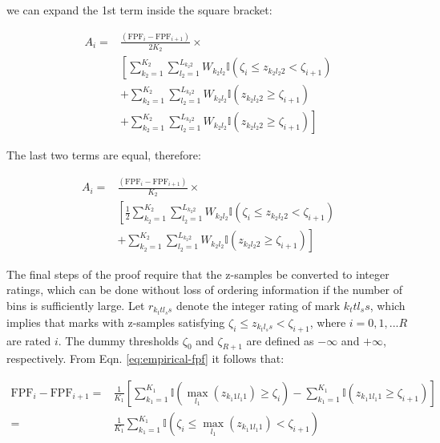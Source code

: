 \documentclass[
]{book}
\begin{document}
we can expand the 1st term inside the square bracket:

\begin{equation}
\begin{aligned}
A_i =&  \frac{\left (\text{FPF}_i - \text{FPF}_{i+1}\right )}{2K_2} \times \\ 
& \left[ \sum_{k_2=1}^{K_2}\sum_{l_2=1}^{L_{k_2 2}}W_{k_2 l_2} \mathbb{I}\left ( \zeta_{i} \leq z_{k_2 l_2 2} < \zeta_{i+1} \right ) \right. \\
&+ \sum_{k_2=1}^{K_2}\sum_{l_2=1}^{L_{k_2 2}}W_{k_2 l_2} \mathbb{I}\left ( z_{k_2 l_2 2} \geq \zeta_{i+1} \right ) \\ 
&+ \left. \sum_{k_2=1}^{K_2}\sum_{l_2=1}^{L_{k_2 2}}W_{k_2 l_2} \mathbb{I}\left ( z_{k_2 l_2 2} \geq \zeta_{i+1} \right ) \right]  
\end{aligned}
\end{equation}

The last two terms are equal, therefore:

\begin{equation}
\begin{aligned}
A_i =& \frac{\left (\text{FPF}_i - \text{FPF}_{i+1}\right )}{K_2} \times \\ 
& \left[ \frac{1}{2} \sum_{k_2=1}^{K_2}\sum_{l_2=1}^{L_{k_2 2}}W_{k_2 l_2} \mathbb{I}\left ( \zeta_{i} \leq z_{k_2 l_2 2} < \zeta_{i+1} \right ) \right. \\
& +\left. \sum_{k_2=1}^{K_2}\sum_{l_2=1}^{L_{k_2 2}}W_{k_2 l_2} \mathbb{I}\left ( z_{k_2 l_2 2} \geq \zeta_{i+1} \right ) \right]  
\end{aligned}
\label{eq:empirical-theorem3}
\end{equation}

The final steps of the proof require that the z-samples be converted to integer ratings, which can be done without loss of ordering information if the number of bins is sufficiently large. Let \(r_{k_t t l_s s}\) denote the integer rating of mark \(k_t tl_s s\), which implies that marks with z-samples satisfying \(\zeta_i \leq z_{k_t l_s s} < \zeta_{i+1}\), where \(i=0,1,...R\) are rated \(i\). The dummy thresholds \(\zeta_0\) and \(\zeta_{R+1}\) are defined as \(-\infty\) and \(+\infty\), respectively. From Eqn. \eqref{eq:empirical-fpf} it follows that:

\begin{equation}
\begin{aligned}
\text{FPF}_i - \text{FPF}_{i+1}=& \frac{1}{K_1} \left[ \sum_{k_1=1}^{K_1} \mathbb{I}\left ( \max_{l_1} \left (z_{k_1 1 l_1 1}  \right ) \geq \zeta_i \right ) - \sum_{k_1=1}^{K_1} \mathbb{I}\left ( z_{k_1 1 l_1 1} \geq \zeta_{i+1} \right ) \right] \\
=& \frac{1}{K_1} \sum_{k_1=1}^{K_1} \mathbb{I}\left ( \zeta_i \leq \max_{l_1} \left (z_{k_1 1 l_1 1}  \right ) < \zeta_{i+1} \right ) 
\end{aligned}
\label{eq:empirical-theorem4}
\end{equation}
\end{document}

